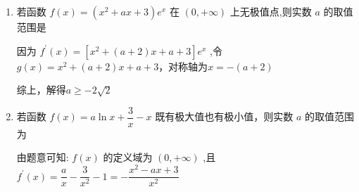 \begin{enumerate}
\begin{enumerate}
\begin{jieda}
            $\because$ 函数 $f\left( x\right)$ 在 $x =  - 1$ 处有极值 0,
            
            $\therefore {f}^{\prime }\left( {-1}\right)  = 3 - {6a} + b = 0$ 且 $f\left( {-1}\right)  =  - 1 + {3a} - b + {a}^{2} = 0$ ,
            
            $\therefore a = 1,b = 3$ 或 $a = 2,b = 9$ ,
            
            $a = 1,b = 3$ 时 ${f}^{\prime }\left( x\right)  = 3{x}^{2} + {6x} + 3 \geq  0$ 恒成立,此时函数无极值点,
            
            当 $a = 2,b = 9$ 时， ${f}^{\prime }\left( x\right)  = 3{x}^{2} + {12x} + 9 = 3\left( {x + 1}\right) \left( {x + 3}\right)$ ,
            
            此时 $x =  - 1$ 是函数的极值,满足条件,
            
            $\therefore a = 2,b = 9,\therefore a - b =  - 7$ .
        \end{jieda}

        
        \item 若函数 $f\left( x\right)  = \left( {{x}^{2} + {ax} + 3}\right) {{e}}^{x}$ 在 $\left( {0, + \infty }\right)$ 上无极值点,则实数 $a$ 的取值范围是
        \begin{jieda}
            因为 ${f}^{\prime }\left( x\right)  = \left\lbrack  {{x}^{2} + \left( {a + 2}\right) x + a + 3}\right\rbrack  {{e}}^{x}$ ,令 $g\left( x\right)  = {x}^{2} + \left( {a + 2}\right) x + a + 3$，对称轴为$x = -(a+2)$
            综上，解得$a \geq   - 2\sqrt{2}$
        \end{jieda}

        
        \item 若函数 $f\left( x\right)  = a\ln x + \dfrac{3}{x} - x$ 既有极大值也有极小值，则实数 $a$ 的取值范围为

        \begin{jieda}
            由题意可知: $f\left( x\right)$ 的定义域为 $\left( {0, + \infty }\right)$ ,且 ${f}^{\prime }\left( x\right)  = \dfrac{a}{x} - \dfrac{3}{{x}^{2}} - 1 =  - \dfrac{{x}^{2} - {ax} + 3}{{x}^{2}}$
            

\end{jieda}
\end{enumerate}
\end{enumerate}
